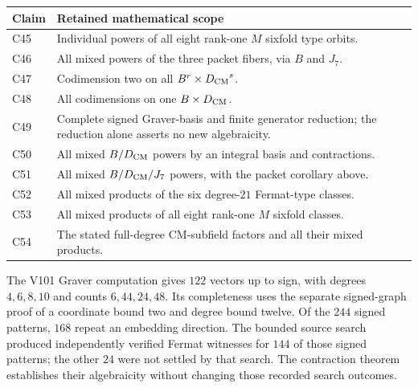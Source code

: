 \begin{center}
\small
\begin{tabular}{@{}p{.10\linewidth}p{.82\linewidth}@{}}
\toprule
Claim & Retained mathematical scope\\
\midrule
C45 & Individual powers of all eight rank-one $M$ sixfold type orbits.\\
C46 & All mixed powers of the three packet fibers, via $B$ and $J_7$.\\
C47 & Codimension two on all $B^r\times {\ensuremath{D_{\mathrm{CM}}}}^s$.\\
C48 & All codimensions on one $B\times {\ensuremath{D_{\mathrm{CM}}}}$.\\
C49 & Complete signed Graver-basis and finite generator reduction;
the reduction alone asserts no new algebraicity.\\
C50 & All mixed $B/{D_{\mathrm{CM}}}$ powers by an integral basis and contractions.\\
C51 & All mixed $B/{D_{\mathrm{CM}}}/J_7$ powers, with the packet corollary above.\\
C52 & All mixed products of the six degree-$21$ Fermat-type classes.\\
C53 & All mixed products of all eight rank-one $M$ sixfold classes.\\
C54 & The stated full-degree CM-subfield factors and all their mixed products.\\
\bottomrule
\end{tabular}
\end{center}

The V101 Graver computation gives $122$ vectors up to sign, with degrees
$4,6,8,10$ and counts $6,44,24,48$. Its completeness uses the separate
signed-graph proof of a coordinate bound two and degree bound twelve.
Of the $244$ signed patterns, $168$ repeat an embedding direction.
The bounded source search produced independently verified Fermat
witnesses for $144$ of those signed patterns; the other $24$ were not
settled by that search. The contraction theorem establishes their
algebraicity without changing those recorded search outcomes.


